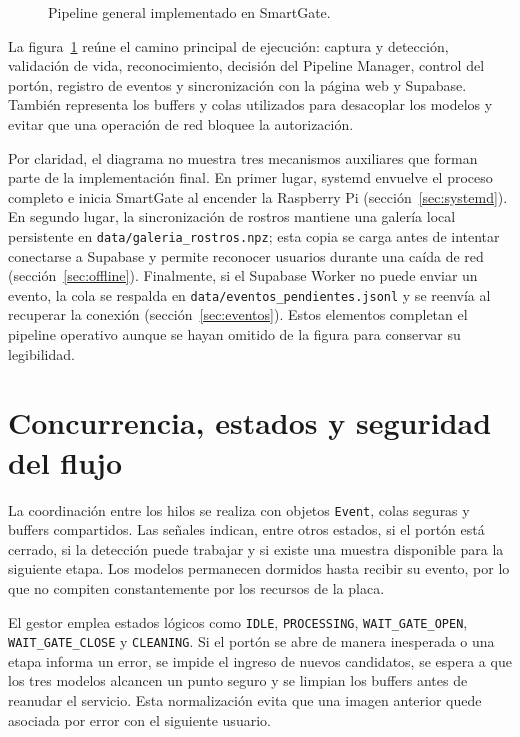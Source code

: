 \begin{figure}[H]
    \centering
    \caption{Pipeline general implementado en SmartGate.}
    \label{fig:pipeline-general-smartgate}
\end{figure}

La figura~\ref{fig:pipeline-general-smartgate} reúne el camino principal de ejecución: captura y detección, validación de vida, reconocimiento, decisión del Pipeline Manager, control del portón, registro de eventos y sincronización con la página web y Supabase. También representa los buffers y colas utilizados para desacoplar los modelos y evitar que una operación de red bloquee la autorización.

Por claridad, el diagrama no muestra tres mecanismos auxiliares que forman parte de la implementación final. En primer lugar, systemd envuelve el proceso completo e inicia SmartGate al encender la Raspberry Pi (sección~\ref{sec:systemd}). En segundo lugar, la sincronización de rostros mantiene una galería local persistente en \texttt{data/galeria\_rostros.npz}; esta copia se carga antes de intentar conectarse a Supabase y permite reconocer usuarios durante una caída de red (sección~\ref{sec:offline}). Finalmente, si el Supabase Worker no puede enviar un evento, la cola se respalda en \texttt{data/eventos\_pendientes.jsonl} y se reenvía al recuperar la conexión (sección~\ref{sec:eventos}). Estos elementos completan el pipeline operativo aunque se hayan omitido de la figura para conservar su legibilidad.

\section{Concurrencia, estados y seguridad del flujo}

La coordinación entre los hilos se realiza con objetos \texttt{Event}, colas seguras y buffers compartidos. Las señales indican, entre otros estados, si el portón está cerrado, si la detección puede trabajar y si existe una muestra disponible para la siguiente etapa. Los modelos permanecen dormidos hasta recibir su evento, por lo que no compiten constantemente por los recursos de la placa.

El gestor emplea estados lógicos como \texttt{IDLE}, \texttt{PROCESSING}, \texttt{WAIT\_GATE\_OPEN}, \texttt{WAIT\_GATE\_CLOSE} y \texttt{CLEANING}. Si el portón se abre de manera inesperada o una etapa informa un error, se impide el ingreso de nuevos candidatos, se espera a que los tres modelos alcancen un punto seguro y se limpian los buffers antes de reanudar el servicio. Esta normalización evita que una imagen anterior quede asociada por error con el siguiente usuario.

